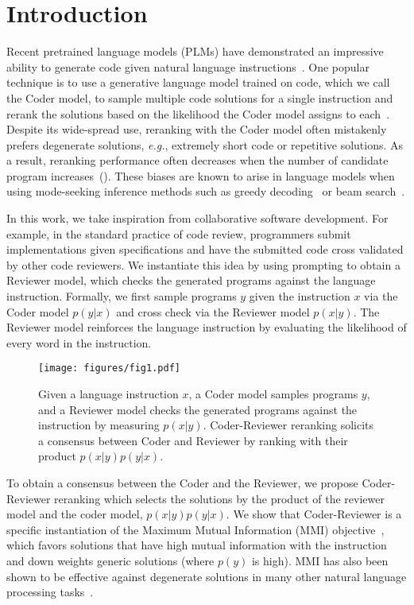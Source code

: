 \documentclass[nohyperref]{article}
\theoremstyle{plain}
\theoremstyle{definition}
\theoremstyle{remark}
\begin{document}
 \section{Introduction}
Recent pretrained language models (PLMs) have demonstrated an impressive ability to generate code given natural language instructions~\citep{codex, incoder, palm, codegen}.
One popular technique is to use a generative language model trained on code, which we call the Coder model, to sample multiple code solutions for a single instruction and rerank the solutions based on the likelihood the Coder model assigns to each~\cite{codex}.
Despite its wide-spread use, reranking with the Coder model often mistakenly prefers degenerate solutions, \emph{e.g.}, extremely short code or repetitive solutions.
As a result, reranking performance often decreases when the number of candidate program increases~().
These biases are known to arise in language models when using mode-seeking inference methods such as greedy decoding~\citep{curious-case} or beam search~\citep{mmi-diversity,stahlberg2019nmt}.

In this work, we take inspiration from collaborative software development.
For example, in the standard practice of code review, programmers submit implementations given specifications and have the submitted code cross validated by other code reviewers.
We instantiate this idea by using prompting to obtain a Reviewer model, which checks the generated programs against the language instruction. 
Formally, we first sample programs $y$ given the instruction $x$ via the Coder model $p(y|x)$ and cross check via the Reviewer model $p(x|y)$.
The Reviewer model reinforces the language instruction by evaluating the likelihood of every word in the instruction.
\begin{figure}
    \centering
    \texttt{[image: figures/fig1.pdf]}
    \caption{Given a language instruction $x$, a Coder model samples programs $y$, and a Reviewer model checks the generated programs against the instruction by measuring $p(x|y)$. Coder-Reviewer reranking solicits a consensus between Coder and Reviewer by ranking with their product $p(x|y)p(y|x)$.}
    \label{fig:teaser}
    \vspace{-15pt}
\end{figure}


To obtain a consensus between the Coder and the Reviewer, we propose Coder-Reviewer reranking which selects the solutions by the product of the reviewer model and the coder model, $p(x|y)p(y|x)$.
We show that Coder-Reviewer is a specific instantiation of the Maximum Mutual Information (MMI) objective~\citep{mmi-diversity}, which favors solutions that have high mutual information with the instruction and down weights generic solutions (where $p(y)$ is high).
MMI has also been shown to be effective against degenerate solutions in many other natural language processing tasks~\citep{rerank-parsing,generative-qa, pragmatic-inference}.
\end{document}
